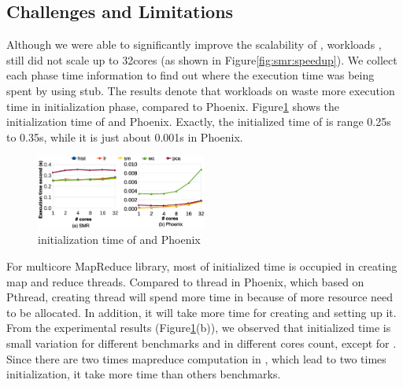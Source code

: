 \subsection{ Challenges and Limitations}	
Although we were able to significantly improve the scalability of \myds, 
workloads ,  still did not scale up to 32cores (as shown in Figure\ref{fig:smr:speedup}). 
We collect each phase time information to find out where the execution time was being spent by using stub. 
The results denote that workloads on \myds waste more execution time in initialization phase, compared to Phoenix.
Figure\ref{fig:env:init} shows the initialization time of \myds and Phoenix.
Exactly, the initialized time of \myds is range 0.25s to 0.35s, while it is just about 0.001s in Phoenix.
\begin{figure}[!h!t]  
	\centering
	\includegraphics[width=0.5\textwidth]{eps/env_init.eps}
	\caption{initialization time of \myds and Phoenix}
	\label{fig:env:init}
\end{figure}


For multicore MapReduce library, most of initialized time is occupied in creating map and reduce threads.
Compared to thread in Phoenix, which based on Pthread, creating thread will spend more time in \myds because of more resource need to be allocated.
In addition, it will take more time for creating  and setting up it.
From the experimental results (Figure\ref{fig:env:init}(b)), we observed that initialized time is small variation for different benchmarks and in different cores count, except for .
Since there are two times mapreduce computation in , which lead to two times initialization, it take more time than others benchmarks.
  

